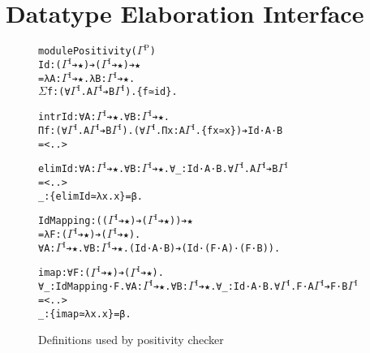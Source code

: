 \documentclass{article}
\newcommand{\splab}[1]{\ensuremath{^{\text{#1}}}}
\begin{document}
\section{Datatype Elaboration Interface}%
\label{sec:generic-interface}%
\begin{figure}[h]
  \caption{Definitions used by positivity checker}
  \label{sfig:elab-toolkit}
{
\begin{alltt}
module Positivity (\(\Gamma\splab{P}\))
Id: (\(\Gamma\splab{I}\) ➔ ★) ➔ (\(\Gamma\splab{I}\) ➔ ★) ➔ ★
= λ A: \(\Gamma\splab{I}\) ➔ ★. λ B: \(\Gamma\splab{I}\) ➔ ★.
  \(\Sigma\) f: (∀ \(\Gamma\splab{I}\). A \(\Gamma\splab{I}\) ➔ B \(\Gamma\splab{I}\)). \{f ≃ id\}.

intrId: ∀ A: \(\Gamma\splab{I}\) ➔ ★. ∀ B: \(\Gamma\splab{I}\) ➔ ★.
  Π f: (∀ \(\Gamma\splab{I}\). A \(\Gamma\splab{I}\) ➔ B \(\Gamma\splab{I}\)). (∀ \(\Gamma\splab{I}\). Π x: A \(\Gamma\splab{I}\). \{f x ≃ x\}) ➔ Id ·A ·B
= <..>

elimId: ∀ A: \(\Gamma\splab{I}\) ➔ ★. ∀ B: \(\Gamma\splab{I}\) ➔ ★. ∀ _: Id ·A ·B. ∀ \(\Gamma\splab{I}\). A \(\Gamma\splab{I}\) ➔ B \(\Gamma\splab{I}\)
= <..>
_ : \{elimId ≃ λ x. x\} = β.

IdMapping: ((\(\Gamma\splab{I}\) ➔ ★) ➔ (\(\Gamma\splab{I}\) ➔ ★)) ➔ ★
= λ F: (\(\Gamma\splab{I}\) ➔ ★) ➔ (\(\Gamma\splab{I}\) ➔ ★).
  ∀ A: \(\Gamma\splab{I}\) ➔ ★. ∀ B: \(\Gamma\splab{I}\) ➔ ★. (Id ·A ·B) ➔ (Id ·(F ·A) ·(F ·B)).

imap: ∀ F: (\(\Gamma\splab{I}\) ➔ ★) ➔ (\(\Gamma\splab{I}\) ➔ ★).
  ∀ _: IdMapping ·F. ∀ A: \(\Gamma\splab{I}\) ➔ ★. ∀ B: \(\Gamma\splab{I}\) ➔ ★. ∀ _: Id ·A ·B. ∀ \(\Gamma\splab{I}\). F ·A \(\Gamma\splab{I}\) ➔ F ·B \(\Gamma\splab{I}\)
= <..>
_ : \{imap ≃ λ x. x\} = β.
\end{alltt}
}
\end{figure}
\end{document}
